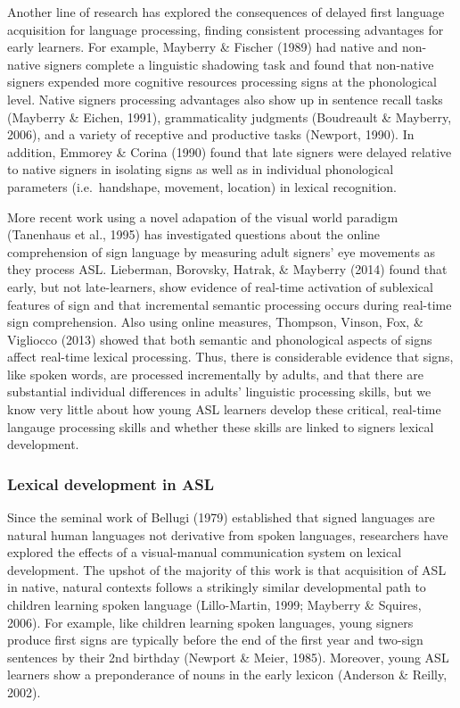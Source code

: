 \documentclass[12pt,]{article}
\begin{document}
Another line of research has explored the consequences of delayed first
language acquisition for language processing, finding consistent
processing advantages for early learners. For example, Mayberry \&
Fischer (1989) had native and non-native signers complete a linguistic
shadowing task and found that non-native signers expended more cognitive
resources processing signs at the phonological level. Native signers
processing advantages also show up in sentence recall tasks (Mayberry \&
Eichen, 1991), grammaticality judgments (Boudreault \& Mayberry, 2006),
and a variety of receptive and productive tasks (Newport, 1990). In
addition, Emmorey \& Corina (1990) found that late signers were delayed
relative to native signers in isolating signs as well as in individual
phonological parameters (i.e.~handshape, movement, location) in lexical
recognition.

More recent work using a novel adapation of the visual world paradigm
(Tanenhaus et al., 1995) has investigated questions about the online
comprehension of sign language by measuring adult signers' eye movements
as they process ASL. Lieberman, Borovsky, Hatrak, \& Mayberry (2014)
found that early, but not late-learners, show evidence of real-time
activation of sublexical features of sign and that incremental semantic
processing occurs during real-time sign comprehension. Also using online
measures, Thompson, Vinson, Fox, \& Vigliocco (2013) showed that both
semantic and phonological aspects of signs affect real-time lexical
processing. Thus, there is considerable evidence that signs, like spoken
words, are processed incrementally by adults, and that there are
substantial individual differences in adults' linguistic processing
skills, but we know very little about how young ASL learners develop
these critical, real-time langauge processing skills and whether these
skills are linked to signers lexical development.

\subsubsection{Lexical development in
ASL}\label{lexical-development-in-asl}

Since the seminal work of Bellugi (1979) established that signed
languages are natural human languages not derivative from spoken
languages, researchers have explored the effects of a visual-manual
communication system on lexical development. The upshot of the majority
of this work is that acquisition of ASL in native, natural contexts
follows a strikingly similar developmental path to children learning
spoken language (Lillo-Martin, 1999; Mayberry \& Squires, 2006). For
example, like children learning spoken languages, young signers produce
first signs are typically before the end of the first year and two-sign
sentences by their 2nd birthday (Newport \& Meier, 1985). Moreover,
young ASL learners show a preponderance of nouns in the early lexicon
(Anderson \& Reilly, 2002).
\end{document}
